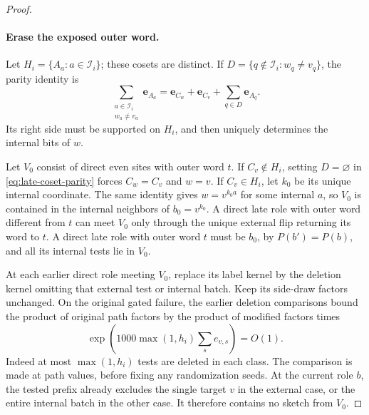\begin{proof}
\paragraph{Erase the exposed outer word.}
Let \(H_i=\{A_a:a\in\mathcal I_i\}\); these cosets are distinct.
If \(D=\{q\notin\mathcal I_i:w_q\ne v_q\}\), the parity identity is
\begin{equation}
 \sum_{\substack{a\in\mathcal I_i\\w_a\ne v_a}}\boldsymbol e_{A_a}
 =\boldsymbol e_{C_w}+\boldsymbol e_{C_v}
       +\sum_{q\in D}\boldsymbol e_{A_q}.
 \label{eq:late-coset-parity}
\end{equation}
Its right side must be supported on \(H_i\), and then uniquely
determines the internal bits of \(w\).

Let \(V_0\) consist of direct even sites with outer word \(t\).
If \(C_v\notin H_i\), setting \(D=\varnothing\) in
\eqref{eq:late-coset-parity} forces \(C_w=C_v\) and \(w=v\).
If \(C_v\in H_i\), let \(k_0\) be its unique internal coordinate.
The same identity gives \(w=v^{k_0a}\) for some internal \(a\), so
\(V_0\) is contained in the internal neighbors of \(b_0=v^{k_0}\).
A direct late role with outer word different from \(t\) can meet
\(V_0\) only through the unique external flip returning its word to
\(t\). A direct late role with outer word \(t\) must be \(b_0\),
by \(P(b')=P(b)\), and all its internal tests lie in \(V_0\).

At each earlier direct role meeting \(V_0\), replace its label kernel
by the deletion kernel omitting that external test or internal batch.
Keep its side-draw factors unchanged. On the original gated failure,
the earlier deletion comparisons bound the product of original path
factors by the product of modified factors times
\[
 \exp\left(1000\max(1,h_i)\sum_s e_{v,s}\right)=O(1).
\]
Indeed at most \(\max(1,h_i)\) tests are deleted in each class. The
comparison is made at path values, before fixing any randomization seeds.
At the current role \(b\), the tested prefix already excludes the
single target \(v\) in the external case, or the entire internal
batch in the other case. It therefore contains no sketch from \(V_0\).


\end{proof}
